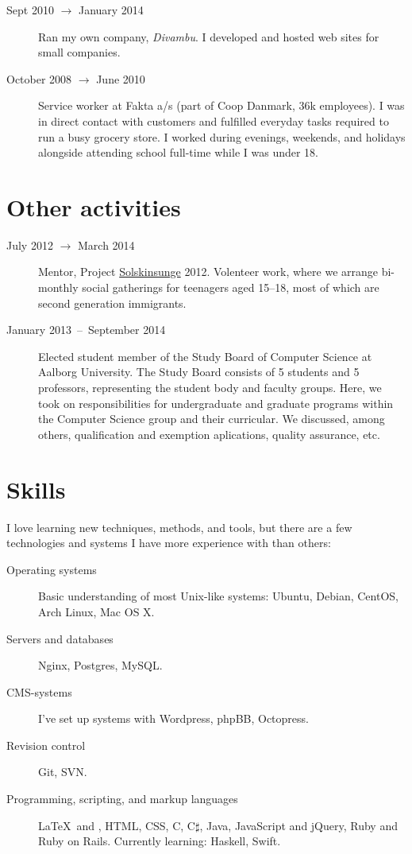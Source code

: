 \documentclass[margin,line]{resume}
\begin{document}
\begin{resume}
\begin{description}
  \item[Sept 2010 $\rightarrow$ January 2014] Ran my own company,
  \emph{Divambu}. I developed and hosted web sites for small companies.

  \item[October 2008 $\rightarrow$ June 2010] Service worker at Fakta
  a/s (part of Coop Danmark, 36k employees). I was in direct contact
  with customers and fulfilled everyday tasks required to run a busy
  grocery store. I worked during evenings, weekends, and holidays
  alongside attending school full-time while I was under 18.
\end{description}

\section{\mysidestyle{} Other activities}\vspace{1mm}
\begin{description}
  \item[July 2012 $\rightarrow$ March 2014] Mentor, Project
    \href{http://www.urk.dk/solskinsunge/}{Solskinsunge} 2012. Volenteer
    work, where we arrange bi-monthly social gatherings for teenagers aged
    15--18, most of which are second generation immigrants.

  \item[January 2013~--~September 2014] Elected student member of the
  Study Board of Computer Science at Aalborg University. The Study Board
  consists of 5 students and 5 professors, representing the student body
  and faculty groups. Here, we took on responsibilities
  for undergraduate and graduate programs within the Computer Science
  group and their curricular. We discussed, among others, qualification
  and exemption aplications, quality assurance, etc.
\end{description}

\section{\mysidestyle{} Skills} \vspace{1mm}
I love learning new techniques, methods, and tools, but there are a few technologies and systems I have more experience with than others:
\vspace{0.5cm}
\begin{description}
  \item[Operating systems] Basic understanding of most Unix-like systems: Ubuntu, Debian, CentOS, Arch Linux, Mac OS X.
  \item[Servers and databases] Nginx, Postgres, MySQL\@.
  \item[CMS-systems] I've set up systems with Wordpress, phpBB, Octopress.
  \item[Revision control] Git, SVN\@.
  \item[Programming, scripting, and markup languages] \LaTeX\ and \XeTeX, HTML, CSS, C, C$\sharp$, Java, JavaScript and jQuery, Ruby and Ruby on Rails. Currently learning: Haskell, Swift.
\end{description}


\end{resume}
\end{document}
